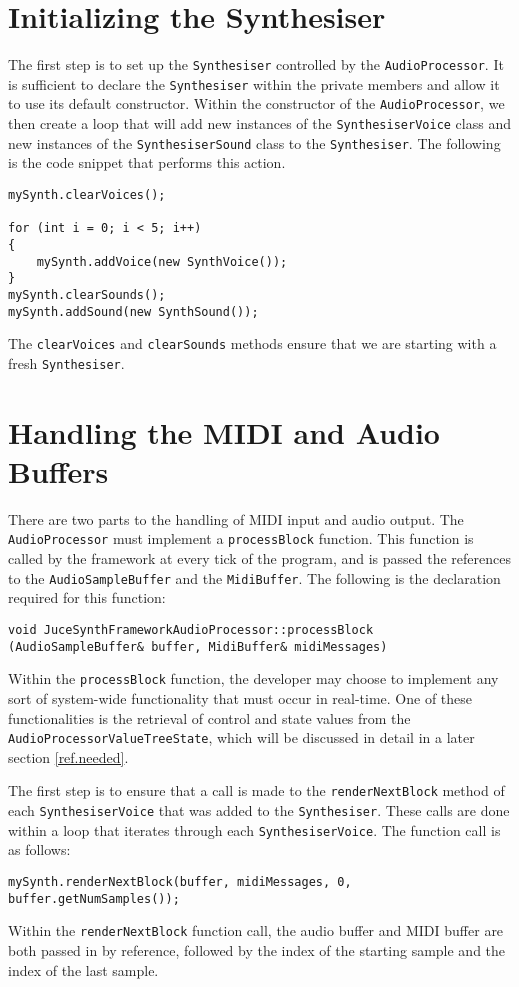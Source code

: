 \documentclass[a4paper,12pt]{report}
\begin{document}
\section{Initializing the Synthesiser}
The first step is to set up the \texttt{Synthesiser} controlled by the \texttt{AudioProcessor}. It is sufficient to declare the \texttt{Synthesiser} within the private members and allow it to use its default constructor. 
Within the constructor of the \texttt{AudioProcessor}, we then create a loop that will add new instances of the \texttt{SynthesiserVoice} class and new instances of the \texttt{SynthesiserSound} class to the \texttt{Synthesiser}. The following is the code snippet that performs this action.
\begin{lstlisting}
mySynth.clearVoices();
    
for (int i = 0; i < 5; i++)
{
    mySynth.addVoice(new SynthVoice());
}
mySynth.clearSounds();
mySynth.addSound(new SynthSound());
\end{lstlisting}
The \texttt{clearVoices} and \texttt{clearSounds} methods ensure that we are starting with a fresh \texttt{Synthesiser}.

\section{Handling the MIDI and Audio Buffers}
There are two parts to the handling of MIDI input and audio output. The \texttt{AudioProcessor} must implement a \texttt{processBlock} function. This function is called by the framework at every tick of the program, and is passed the references to the \texttt{AudioSampleBuffer} and the \texttt{MidiBuffer}. The following is the declaration required for this function:
\begin{lstlisting}
void JuceSynthFrameworkAudioProcessor::processBlock (AudioSampleBuffer& buffer, MidiBuffer& midiMessages)
\end{lstlisting}
Within the \texttt{processBlock} function, the developer may choose to implement any sort of system-wide functionality that must occur in real-time. One of these functionalities is the retrieval of control and state values from the \texttt{AudioProcessorValueTreeState}, which will be discussed in detail in a later section \ref{ref.needed}.

The first step is to ensure that a call is made to the \texttt{renderNextBlock} method of each \texttt{SynthesiserVoice} that was added to the \texttt{Synthesiser}. These calls are done within a loop that iterates through each \texttt{SynthesiserVoice}. The function call is as follows: 
\begin{lstlisting}
mySynth.renderNextBlock(buffer, midiMessages, 0, buffer.getNumSamples());
\end{lstlisting}
Within the \texttt{renderNextBlock} function call, the audio buffer and MIDI buffer are both passed in by reference, followed by the index of the starting sample and the index of the last sample.
\end{document}
